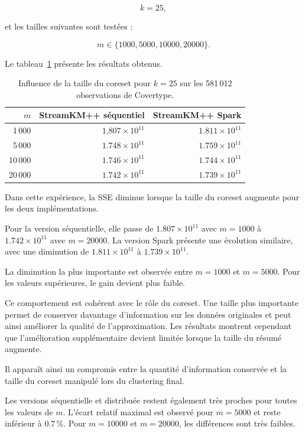 \[
k = 25,
\]

et les tailles suivantes sont testées :

\[
m \in \{1000,5000,10000,20000\}.
\]

Le tableau~\ref{tab:quality-m} présente les résultats obtenus.

\begin{table}[ht]
\centering
\small
\begin{tabular}{rrr}
\toprule
\textbf{\(m\)} &
\textbf{StreamKM++ séquentiel} &
\textbf{StreamKM++ Spark} \\
\midrule
1\,000  & \(1.807 \times 10^{11}\) & \(1.811 \times 10^{11}\) \\
5\,000  & \(1.748 \times 10^{11}\) & \(1.759 \times 10^{11}\) \\
10\,000 & \(1.746 \times 10^{11}\) & \(1.744 \times 10^{11}\) \\
20\,000 & \(1.742 \times 10^{11}\) & \(1.739 \times 10^{11}\) \\
\bottomrule
\end{tabular}
\caption{Influence de la taille du coreset pour \(k=25\) sur les 581\,012 observations de Covertype.}
\label{tab:quality-m}
\end{table}

Dans cette expérience, la SSE diminue lorsque la taille du coreset augmente pour les deux implémentations.

Pour la version séquentielle, elle passe de \(1.807 \times 10^{11}\) avec \(m=1000\) à \(1.742 \times 10^{11}\) avec \(m=20000\). La version Spark présente une évolution similaire, avec une diminution de \(1.811 \times 10^{11}\) à \(1.739 \times 10^{11}\).

La diminution la plus importante est observée entre \(m=1000\) et \(m=5000\). Pour les valeurs supérieures, le gain devient plus faible.

Ce comportement est cohérent avec le rôle du coreset. Une taille plus importante permet de conserver davantage d'information sur les données originales et peut ainsi améliorer la qualité de l'approximation. Les résultats montrent cependant que l'amélioration supplémentaire devient limitée lorsque la taille du résumé augmente.

Il apparaît ainsi un compromis entre la quantité d'information conservée et la taille du coreset manipulé lors du clustering final.

Les versions séquentielle et distribuée restent également très proches pour toutes les valeurs de \(m\). L'écart relatif maximal est observé pour \(m=5000\) et reste inférieur à \(0.7\,\%\). Pour \(m=10000\) et \(m=20000\), les différences sont très faibles.

